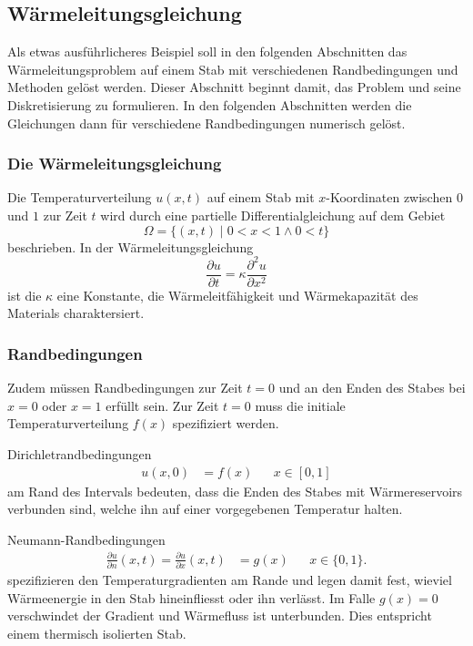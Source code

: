 %
%
%
\subsection{Wärmeleitungsgleichung
\label{buch:subsection:waermeleitung}}
Als etwas ausführlicheres Beispiel soll in den folgenden Abschnitten
das Wärmeleitungsproblem auf einem Stab mit verschiedenen Randbedingungen
und Methoden gelöst werden.
Dieser Abschnitt beginnt damit, das Problem und seine Diskretisierung
zu formulieren.
In den folgenden Abschnitten werden die Gleichungen dann für verschiedene
Randbedingungen numerisch gelöst.

\subsubsection{Die Wärmeleitungsgleichung}
Die Temperaturverteilung $u(x,t)$ auf einem Stab mit $x$-Koordinaten
zwischen $0$ und $1$ zur Zeit $t$ wird durch eine partielle
Differentialgleichung auf dem Gebiet
\[
\Omega = \{ (x,t)\;|\; 0 < x < 1\wedge 0<t\}
\]
beschrieben.
In der Wärmeleitungsgleichung
\begin{equation}
\frac{\partial u}{\partial t}
=
\kappa\frac{\partial^2 u}{\partial x^2}
\label{buch:pde:waerme:gleichung}
\end{equation}
ist die $\kappa$ eine Konstante, die Wärmeleitfähigkeit und
Wärmekapazität des Materials charaktersiert.

\subsubsection{Randbedingungen}
Zudem müssen Randbedingungen zur Zeit $t=0$ und an den Enden
des Stabes bei $x=0$ oder $x=1$ erfüllt sein.
Zur Zeit $t=0$ muss die initiale Temperaturverteilung $f(x)$ 
spezifiziert werden.

Dirichletrandbedingungen
\[
\begin{aligned}
u(x,0)&=f(x)&&x\in[0,1]
\end{aligned}
\]
am Rand des Intervals bedeuten, dass die Enden des Stabes mit Wärmereservoirs
verbunden sind, welche ihn auf einer vorgegebenen Temperatur halten.

Neumann-Randbedingungen
\[
\begin{aligned}
\frac{\partial u}{\partial n}(x,t)=\frac{\partial u}{\partial x}(x,t)&=g(x)&&x\in \{0,1\}.
\end{aligned}
\]
spezifizieren den Temperaturgradienten am Rande und legen damit fest,
wieviel Wärmeenergie in den Stab hineinfliesst oder ihn verlässt.
Im Falle $g(x)=0$ verschwindet der Gradient und Wärmefluss ist unterbunden.
Dies entspricht einem thermisch isolierten Stab.

